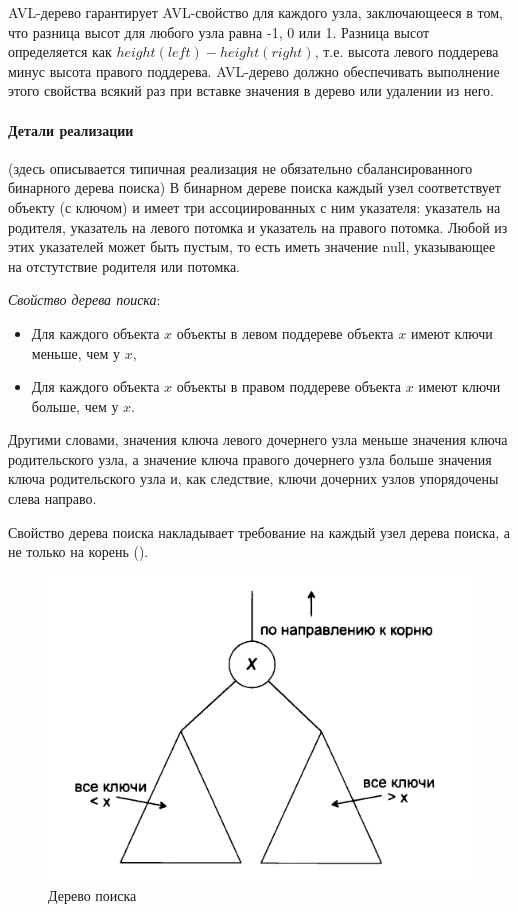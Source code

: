\documentclass[%
	11pt,
	a4paper,
	utf8,
		]{article}
\begin{document}
AVL-дерево гарантирует AVL-свойство для каждого узла, заключающееся в том, что разница высот для любого узла равна -1, 0 или 1. Разница высот определяется как $ height(left) - height(right) $, т.е. высота левого поддерева минус высота правого поддерева. AVL-дерево должно обеспечивать выполнение этого свойства всякий раз при вставке значения в дерево или удалении из него. 

\paragraph{Детали реализации} (здесь описывается типичная реализация не обязательно сбалансированного бинарного дерева поиска) В бинарном дереве поиска каждый узел соответствует объекту (с ключом) и имеет три ассоциированных с ним указателя: указатель на родителя, указатель на левого потомка и указатель на правого потомка. Любой из этих указателей может быть пустым, то есть иметь значение null, указывающее на отстутствие родителя или потомка. 

\emph{Свойство дерева поиска}:
\begin{itemize}
	\item Для каждого объекта $ x $ объекты в левом поддереве объекта $ x $ имеют ключи меньше, чем у $ x $,
	
	\item Для каждого объекта $ x $ объекты в правом поддереве объекта $ x $ имеют ключи больше, чем у $ x $.
\end{itemize}

Другими словами, значения ключа левого дочернего узла меньше значения ключа родительского узла, а значение ключа правого дочернего узла больше значения ключа родительского узла и, как следствие, ключи дочерних узлов упорядочены слева направо.

Свойство дерева поиска накладывает требование на каждый узел дерева поиска, а не только на корень ().

\begin{figure}[h]
	\centering
	\includegraphics[scale=0.85]{figures/tree_search_schema1.png}
	\caption{ Дерево поиска }\label{fig:tree_search_schema1}
\end{figure}
\end{document}
